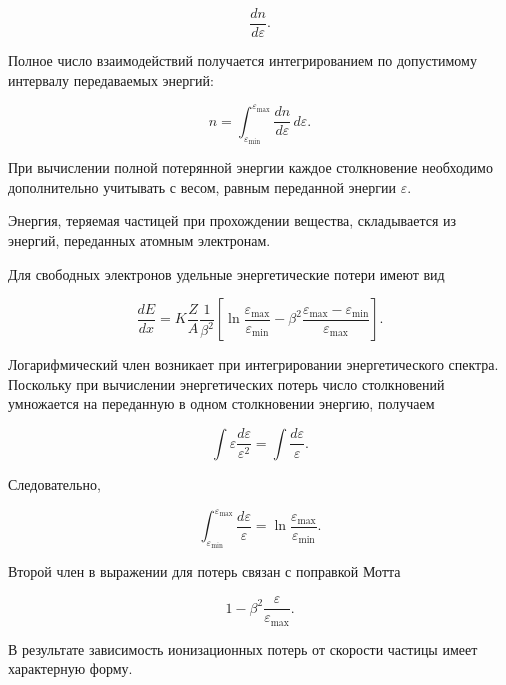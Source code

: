 \documentclass[../final.tex]{subfiles}
\begin{document}
\[
    \frac{dn}{d\varepsilon}.
\]

Полное число взаимодействий получается интегрированием по допустимому
интервалу передаваемых энергий:

\begin{equation*}
    n
    =
    \int_{\varepsilon_{\min}}^{\varepsilon_{\max}}
    \frac{dn}{d\varepsilon}
    \,d\varepsilon.
\end{equation*}

При вычислении полной потерянной энергии каждое столкновение необходимо
дополнительно учитывать с весом, равным переданной энергии
$\varepsilon$.

Энергия, теряемая частицей при прохождении вещества, складывается
из энергий, переданных атомным электронам.

Для свободных электронов удельные энергетические потери имеют вид

\begin{equation*}
    \frac{dE}{dx}
    =
    K
    \frac{Z}{A}
    \frac{1}{\beta^2}
    \left[
        \ln
        \frac{
            \varepsilon_{\max}
        }{
            \varepsilon_{\min}
        }
        -
        \beta^2
        \frac{
            \varepsilon_{\max}
            -
            \varepsilon_{\min}
        }{
            \varepsilon_{\max}
        }
    \right].
\end{equation*}

Логарифмический член возникает при интегрировании энергетического
спектра. Поскольку при вычислении энергетических потерь число
столкновений умножается на переданную в одном столкновении энергию,
получаем

\begin{equation*}
    \int
    \varepsilon
    \frac{d\varepsilon}{\varepsilon^2}
    =
    \int
    \frac{d\varepsilon}{\varepsilon}.
\end{equation*}

Следовательно,

\begin{equation*}
    \int_{\varepsilon_{\min}}^{\varepsilon_{\max}}
    \frac{d\varepsilon}{\varepsilon}
    =
    \ln
    \frac{
        \varepsilon_{\max}
    }{
        \varepsilon_{\min}
    }.
\end{equation*}

Второй член в выражении для потерь связан с поправкой Мотта

\[
    1
    -
    \beta^2
    \frac{\varepsilon}{
        \varepsilon_{\max}
    }.
\]

В результате зависимость ионизационных потерь от скорости частицы
имеет характерную форму.
\end{document}
